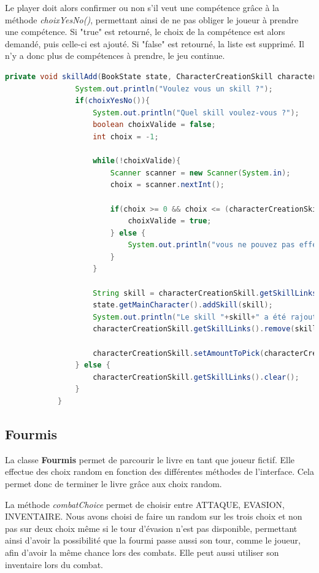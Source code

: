 		Le player doit alors confirmer ou non s'il veut une compétence grâce à la méthode \textit{choixYesNo()}, permettant ainsi de ne pas obliger le joueur à prendre une compétence. Si "true" est retourné, le choix de la compétence est alors demandé, puis celle-ci est ajouté. Si "false" est retourné, la liste est supprimé. Il n'y a donc plus de compétences à prendre, le jeu continue.

		\begin{lstlisting}[gobble=12, language=java, label=skillAdd, caption=skillAdd()]
			private void skillAdd(BookState state, CharacterCreationSkill characterCreationSkill){
				System.out.println("Voulez vous un skill ?");
				if(choixYesNo()){
					System.out.println("Quel skill voulez-vous ?");
					boolean choixValide = false;
					int choix = -1;

					while(!choixValide){
						Scanner scanner = new Scanner(System.in);
						choix = scanner.nextInt();

						if(choix >= 0 && choix <= (characterCreationSkill.getSkillLinks().size()-1)){
							choixValide = true;
						} else {
							System.out.println("vous ne pouvez pas effectuer ce choix");
						}
					}

					String skill = characterCreationSkill.getSkillLinks().get(choix);
					state.getMainCharacter().addSkill(skill);
					System.out.println("Le skill "+skill+" a été rajouté");
					characterCreationSkill.getSkillLinks().remove(skill);

					characterCreationSkill.setAmountToPick(characterCreationSkill.getAmountToPick()-1);
				} else {
					characterCreationSkill.getSkillLinks().clear();
				}
			}
			\end{lstlisting}



	\subsection{Fourmis}\label{sub:fourmis}
		La classe \textbf{Fourmis} permet de parcourir le livre en tant que joueur fictif. Elle effectue des choix random en fonction des différentes méthodes de l'interface. Cela permet donc de terminer le livre grâce aux choix random.

		La méthode \textit{combatChoice} permet de choisir entre ATTAQUE, EVASION, INVENTAIRE. Nous avons choisi de faire un random sur les trois choix et non pas sur deux choix même si le tour d'évasion n'est pas disponible, permettant ainsi d'avoir la possibilité que la fourmi passe aussi son tour, comme le joueur, afin d'avoir la même chance lors des combats. Elle peut aussi utiliser son inventaire lors du combat.

